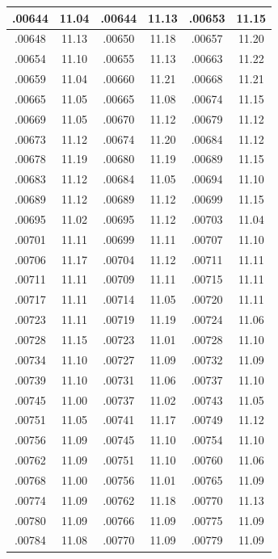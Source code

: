 \documentclass[10pt,twoside]{report}
\begin{document}
\begin{appendices}
\begin{longtable}{|c|c||c|c||c|c|}
.00644 & 11.04 & .00644 & 11.13 & .00653 & 11.15\\\hline
.00648 & 11.13 & .00650 & 11.18 & .00657 & 11.20\\\hline
.00654 & 11.10 & .00655 & 11.13 & .00663 & 11.22\\\hline
.00659 & 11.04 & .00660 & 11.21 & .00668 & 11.21\\\hline
.00665 & 11.05 & .00665 & 11.08 & .00674 & 11.15\\\hline
.00669 & 11.05 & .00670 & 11.12 & .00679 & 11.12\\\hline
.00673 & 11.12 & .00674 & 11.20 & .00684 & 11.12\\\hline
.00678 & 11.19 & .00680 & 11.19 & .00689 & 11.15\\\hline
.00683 & 11.12 & .00684 & 11.05 & .00694 & 11.10\\\hline
.00689 & 11.12 & .00689 & 11.12 & .00699 & 11.15\\\hline
.00695 & 11.02 & .00695 & 11.12 & .00703 & 11.04\\\hline
.00701 & 11.11 & .00699 & 11.11 & .00707 & 11.10\\\hline
.00706 & 11.17 & .00704 & 11.12 & .00711 & 11.11\\\hline
.00711 & 11.11 & .00709 & 11.11 & .00715 & 11.11\\\hline
.00717 & 11.11 & .00714 & 11.05 & .00720 & 11.11\\\hline
.00723 & 11.11 & .00719 & 11.19 & .00724 & 11.06\\\hline
.00728 & 11.15 & .00723 & 11.01 & .00728 & 11.10\\\hline
.00734 & 11.10 & .00727 & 11.09 & .00732 & 11.09\\\hline
.00739 & 11.10 & .00731 & 11.06 & .00737 & 11.10\\\hline
.00745 & 11.00 & .00737 & 11.02 & .00743 & 11.05\\\hline
.00751 & 11.05 & .00741 & 11.17 & .00749 & 11.12\\\hline
.00756 & 11.09 & .00745 & 11.10 & .00754 & 11.10\\\hline
.00762 & 11.09 & .00751 & 11.10 & .00760 & 11.06\\\hline
.00768 & 11.00 & .00756 & 11.01 & .00765 & 11.09\\\hline
.00774 & 11.09 & .00762 & 11.18 & .00770 & 11.13\\\hline
.00780 & 11.09 & .00766 & 11.09 & .00775 & 11.09\\\hline
.00784 & 11.08 & .00770 & 11.09 & .00779 & 11.09\\\hline

\end{longtable}
\end{appendices}
\end{document}
